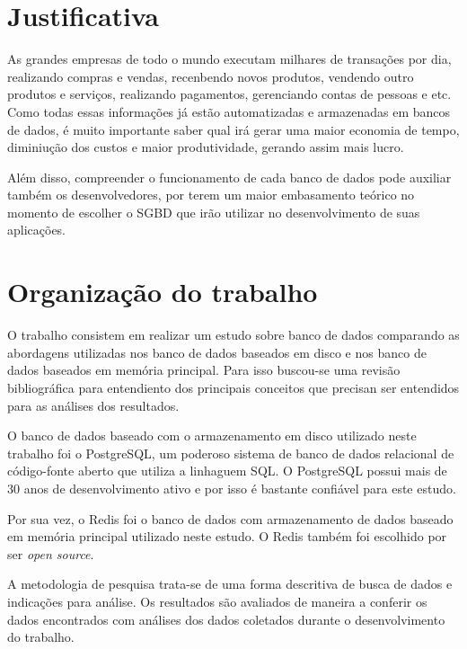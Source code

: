 \section{Justificativa}
\label{secao2}

As grandes empresas de todo o mundo executam milhares de transações por dia, realizando compras e vendas, recenbendo novos produtos, vendendo outro produtos e serviços, realizando pagamentos, gerenciando contas de pessoas e etc. Como todas essas informações já estão automatizadas e armazenadas em bancos de dados, é muito importante saber qual irá gerar uma maior economia de tempo, diminiução dos custos e maior produtividade, gerando assim mais lucro. 

Além disso, compreender o funcionamento de cada banco de dados pode auxiliar também os desenvolvedores, por terem um maior embasamento teórico no momento de escolher o \ac{SGBD} que irão utilizar no desenvolvimento de suas aplicações. 



\section{Organização do trabalho}

O trabalho consistem em realizar um estudo sobre banco de dados comparando as abordagens utilizadas nos banco de dados baseados em disco e nos banco de dados baseados em memória principal. Para isso buscou-se uma revisão bibliográfica para entendiento dos principais conceitos que precisan ser entendidos para as análises dos resultados. 

O banco de dados baseado com o armazenamento em disco utilizado neste trabalho foi o PostgreSQL, um poderoso sistema de banco de dados relacional de código-fonte aberto que utiliza a linhaguem SQL. O PostgreSQL possui mais de 30 anos de desenvolvimento ativo e por isso é bastante confiável para este estudo. 

Por sua vez, o Redis foi o banco de dados com armazenamento de dados baseado em memória principal utilizado neste estudo. O Redis também foi escolhido por ser \textit{open source}.

A metodologia de pesquisa trata-se de uma forma descritiva de busca de dados e indicações para análise. Os resultados são avaliados de maneira a conferir os dados encontrados com análises dos dados coletados durante o desenvolvimento do trabalho. 

